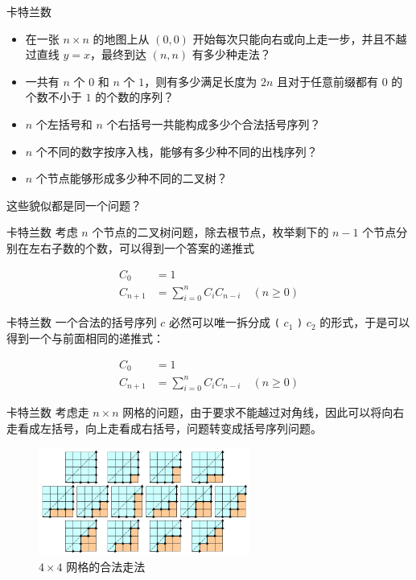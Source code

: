 \documentclass[12pt,aspectratio=169,handout]{beamer}
\begin{document}
\begin{frame}[fragile]{卡特兰数}
\begin{itemize}
  \item 在一张 $n \times n$ 的地图上从 $(0, 0)$ 开始每次只能向右或向上走一步，并且不越过直线 $y=x$，最终到达 $(n, n)$ 有多少种走法？
  \item 一共有 $n$ 个 $0$ 和 $n$ 个 $1$，则有多少满足长度为 $2n$ 且对于任意前缀都有 $0$ 的个数不小于 $1$ 的个数的序列？
  \item $n$ 个左括号和 $n$ 个右括号一共能构成多少个合法括号序列？
  \item $n$ 个不同的数字按序入栈，能够有多少种不同的出栈序列？
  \item $n$ 个节点能够形成多少种不同的二叉树？
\end{itemize}
\pause

这些貌似都是同一个问题？
\end{frame}

\begin{frame}[fragile]{卡特兰数}
考虑 $n$ 个节点的二叉树问题，除去根节点，枚举剩下的 $n-1$ 个节点分别在左右子数的个数，可以得到一个答案的递推式

$$
\begin{aligned}
C_{0} &= 1 \\
C_{n+1} &= \sum_{i=0}^{n} C_{i} C_{n-i} \quad (n \ge 0)
\end{aligned}
$$
\end{frame}

\begin{frame}[fragile]{卡特兰数}
一个合法的括号序列 $c$ 必然可以唯一拆分成 \verb|(| $c_1$ \verb|)| $c_2$ 的形式，于是可以得到一个与前面相同的递推式：

$$
\begin{aligned}
C_{0} &= 1 \\
C_{n+1} &= \sum_{i=0}^{n} C_{i} C_{n-i} \quad (n \ge 0)
\end{aligned}
$$
\end{frame}

\begin{frame}[fragile]{卡特兰数}
考虑走 $n \times n$ 网格的问题，由于要求不能越过对角线，因此可以将向右走看成左括号，向上走看成右括号，问题转变成括号序列问题。

\begin{figure}
  \centering
  \includegraphics[height=100pt]{walk.png}
  \caption{$4 \times 4$ 网格的合法走法}
\end{figure}
\end{frame}
\end{document}
